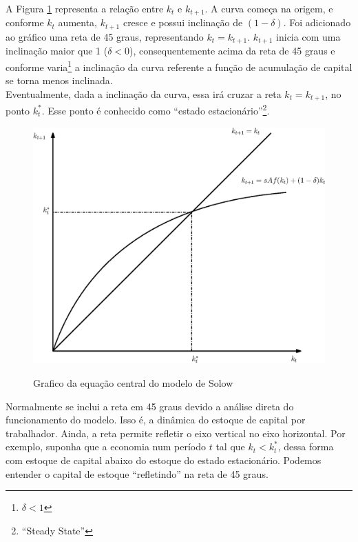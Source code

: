 \documentclass[11pt,a4paper]{article}
\begin{document}
A Figura \ref{fig:eqcentral} representa a relação entre $k_t$ e $k_{t+1}$. A curva começa na origem, e conforme $k_t$ aumenta, $k_{t+1}$ cresce e possui inclinação de $(1-\delta)$. Foi adicionado ao gráfico uma reta de 45 graus, representando $k_t = k_{t+1}$. $k_{t+1}$ inicia com uma inclinação maior que 1 ($\delta < 0$), consequentemente acima da reta de 45 graus e conforme varia\footnote{$\delta < 1$} a inclinação da curva referente a função de acumulação de capital se torna menos inclinada.\\

Eventualmente, dada a inclinação da curva, essa irá cruzar a reta $k_t = k_{t+1}$, no ponto $k_t ^{\ast}$. Esse ponto é conhecido como ``estado estacionário''\footnote{``Steady State''}. \\

\begin{figure}[!h]
\centering
\caption{Grafico da equação central do modelo de Solow} \vspace{2ex}
\includegraphics[scale=.5]{solow01.eps}
\label{fig:eqcentral}
\end{figure} 

Normalmente se inclui a reta em 45 graus devido a análise direta do funcionamento do modelo. Isso é, a dinâmica do estoque de capital por trabalhador. Ainda, a reta permite refletir o eixo vertical no eixo horizontal. Por exemplo, suponha que a economia num período $t$ tal que $k_t < k_t ^{\ast}$, dessa forma com estoque de capital abaixo do estoque do estado estacionário. Podemos entender o capital de estoque ``refletindo'' na reta de 45 graus. 
\end{document}
